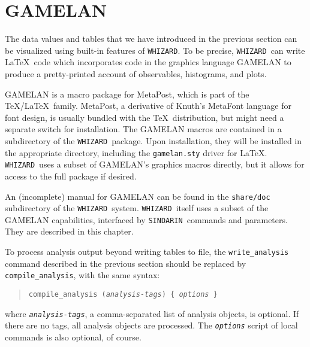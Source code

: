 \documentclass[12pt]{book}
\newcommand{\ttt}[1]{\texttt{#1}}
\newcommand{\whizard}{\texttt{WHIZARD}}
\newcommand{\sindarin}{\texttt{SINDARIN}}
\begin{document}
\section{GAMELAN}

The data values and tables that we have introduced in the previous section can
be visualized using built-in features of \whizard.  To be precise,
\whizard\ can write \LaTeX\ code which incorporates code in the graphics
language GAMELAN to produce a pretty-printed account of observables,
histograms, and plots.  

GAMELAN is a macro package for MetaPost, which is part of the
\TeX/\LaTeX\ family.  MetaPost, a derivative of Knuth's MetaFont language for
font design, is usually bundled with the \TeX\ distribution, but might need a
separate switch for installation.  The GAMELAN macros are contained in a
subdirectory of the \whizard\ package.  Upon installation, they will be
installed in the appropriate directory, including the \ttt{gamelan.sty} driver
for \LaTeX.  \whizard\ uses a subset of GAMELAN's graphics macros
directly, but it allows for access to the full package if desired.

An (incomplete) manual for GAMELAN can be found in the \ttt{share/doc}
subdirectory of the \whizard\ system.  \whizard\ itself uses a subset of the
GAMELAN capabilities, interfaced by \sindarin\ commands and parameters.  They
are described in this chapter.

To process analysis output beyond writing tables to file, the
\ttt{write\_analysis} command described in the previous section should be
replaced by \ttt{compile\_analysis}, with the same syntax:
\begin{quote}
  \begin{footnotesize}
    \ttt{compile\_analysis (\emph{analysis-tags}) \{ \ttt{\emph{options}} \}}
  \end{footnotesize}
\end{quote}
where \ttt{\emph{analysis-tags}}, a comma-separated list of analysis objects,
is optional.  If there are no tags, all analysis objects are processed.  The
\ttt{\emph{options}} script of local commands is also optional, of course.
\end{document}
